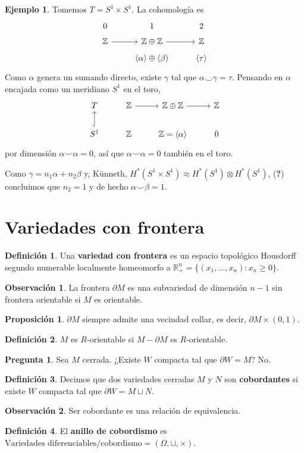 \documentclass[spanish]{book}
\theoremstyle{definition}
\newtheorem*{defn}{Definición}
\newtheorem*{obs}{Observación}
\newtheorem*{prop}{Proposición}
\newtheorem*{ejem}{Ejemplo}
\newtheorem*{pregunta}{Pregunta}
\newcommand{\R}{\mathbb{R}}
\newcommand{\Z}{\mathbb{Z}}
\begin{document}
\begin{ejem}
	Tomemos $T=S^1\times S^1$. La cohomología es
	\[\begin{tikzcd}[row sep=tiny]
		0&1&2\\
		\Z\arrow[r]&\Z\oplus\Z\arrow[r]&\Z\\
		&\langle\alpha\rangle\oplus\langle\beta\rangle&\langle\tau\rangle
	\end{tikzcd}\]
	Como $\alpha$ genera un sumando directo, existe $\gamma$ tal que $\alpha\smile\gamma=\tau$. Pensando en $\alpha$ encajada como un meridiano $S^1$ en el toro,
	\[\begin{tikzcd}
		T&\Z\arrow[r]&\Z\oplus\Z\arrow[r]&\Z\\
		S^1\arrow[u,hook]&\Z&\Z= \langle\alpha\rangle&0
	\end{tikzcd}\]
	por dimensión $\alpha\smile\alpha=0$, así que 
	$\alpha\smile\alpha=0$ también en el toro.
	
	Como $\gamma=n_1\alpha+n_2\beta$ y,  Künneth, $H^*(S^1\times S^1)\approx H^*(S^1)\otimes H^*(S^1)$, (\textbf{?}) concluimos que $n_2=1$ y de hecho $\alpha\smile\beta=1$.
\end{ejem}

\section{Variedades con frontera}
\begin{defn}
	Una \textbf{variedad con frontera} es un espacio topológico Housdorff segundo numerable localmente homeomorfo a $\R^n_+=\{(x_1,\ldots,x_n):x_n\geq0\}$.
\end{defn}
\begin{obs}
	La frontera $\partial M$ es una subvariedad de dimensión $n-1$ sin frontera orientable si $M$ es orientable.
\end{obs}
\begin{prop}
	$\partial M$ siempre admite una vecindad collar, es decir, $\partial M\times(0,1)$.
\end{prop}
\begin{defn}
	$M$ es $R$-orientable si $M-\partial M$ es $R$-orientable.
\end{defn}
\begin{pregunta}
	Sea $M$ cerrada. ¿Existe $W$ compacta tal que $\partial W=M$? No.
\end{pregunta}

\begin{defn}
	Decimos que dos variedades cerradas $M$ y $N$ son \textbf{cobordantes} si existe $W$ compacta tal que $\partial W=M\sqcup N$.
\end{defn}
\begin{obs}
	Ser cobordante es una relación de equivalencia.
\end{obs}
\begin{defn}
	El \textbf{anillo de cobordismo} es $\text{Variedades diferenciables}\Big/\text{cobordismo}=(\Omega,\sqcup,\times)$.
\end{defn}
\end{document}
